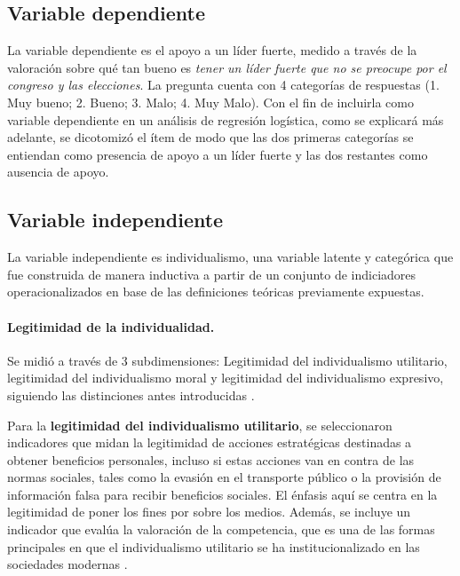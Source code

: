 \documentclass[12pt,oneside]{templates/facsothesis}
\begin{document}
\hypertarget{variable-dependiente}{%
\subsection*{Variable dependiente}\label{variable-dependiente}}

La variable dependiente es el apoyo a un líder fuerte, medido a través de la valoración sobre qué tan bueno es \emph{tener un líder fuerte que no se preocupe por el congreso y las elecciones}. La pregunta cuenta con 4 categorías de respuestas (1. Muy bueno; 2. Bueno; 3. Malo; 4. Muy Malo). Con el fin de incluirla como variable dependiente en un análisis de regresión logística, como se explicará más adelante, se dicotomizó el ítem de modo que las dos primeras categorías se entiendan como presencia de apoyo a un líder fuerte y las dos restantes como ausencia de apoyo.

\hypertarget{variable-independiente}{%
\subsection*{Variable independiente}\label{variable-independiente}}

La variable independiente es individualismo, una variable latente y categórica que fue construida de manera inductiva a partir de un conjunto de indiciadores operacionalizados en base de las definiciones teóricas previamente expuestas.

\hypertarget{legitimidad-de-la-individualidad.}{%
\paragraph*{Legitimidad de la individualidad.}\label{legitimidad-de-la-individualidad.}}

Se midió a través de 3 subdimensiones: Legitimidad del individualismo utilitario, legitimidad del individualismo moral y legitimidad del individualismo expresivo, siguiendo las distinciones antes introducidas \citep{cortois2018}.

Para la \textbf{legitimidad del individualismo utilitario}, se seleccionaron indicadores que midan la legitimidad de acciones estratégicas destinadas a obtener beneficios personales, incluso si estas acciones van en contra de las normas sociales, tales como la evasión en el transporte público o la provisión de información falsa para recibir beneficios sociales. El énfasis aquí se centra en la legitimidad de poner los fines por sobre los medios. Además, se incluye un indicador que evalúa la valoración de la competencia, que es una de las formas principales en que el individualismo utilitario se ha institucionalizado en las sociedades modernas \citep{cortois2018}.
\end{document}
